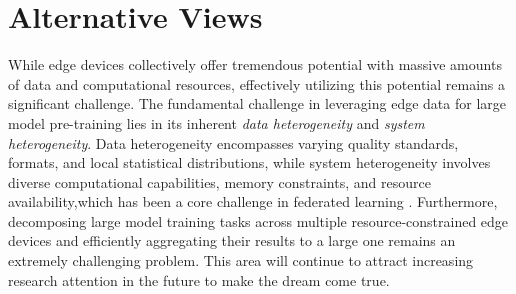 \section{Alternative Views}
While edge devices collectively offer tremendous potential with massive amounts of data and computational resources, effectively utilizing this potential remains a significant challenge. 
The fundamental challenge in leveraging edge data for large model pre-training lies in its inherent \textit{data heterogeneity} and \textit{system heterogeneity}. 
Data heterogeneity encompasses varying quality standards, formats, and local statistical distributions, while system heterogeneity involves diverse computational capabilities, memory constraints, and resource availability,which has been a core challenge in federated learning \cite{mcmahan2017communication}. 
Furthermore, decomposing large model training tasks across multiple resource-constrained edge devices and efficiently aggregating their results to a large one remains an extremely challenging problem.
This area will continue to attract increasing research attention in the future to make the dream come true.





